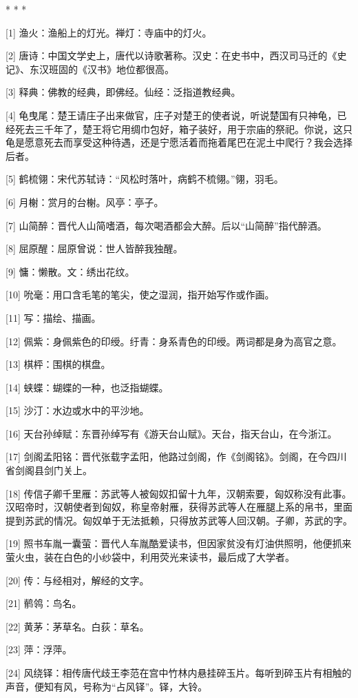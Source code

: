 \documentclass[12pt,UTF8]{ctexbook}
\begin{document}
* * *



[1] 渔火：渔船上的灯光。禅灯：寺庙中的灯火。

[2] 唐诗：中国文学史上，唐代以诗歌著称。汉史：在史书中，西汉司马迁的《史记》、东汉班固的《汉书》地位都很高。

[3] 释典：佛教的经典，即佛经。仙经：泛指道教经典。

[4] 龟曳尾：楚王请庄子出来做官，庄子对楚王的使者说，听说楚国有只神龟，已经死去三千年了，楚王将它用绸巾包好，箱子装好，用于宗庙的祭祀。你说，这只龟是愿意死去而享受这种待遇，还是宁愿活着而拖着尾巴在泥土中爬行？我会选择后者。

[5] 鹤梳翎：宋代苏轼诗：“风松时落叶，病鹤不梳翎。”翎，羽毛。

[6] 月榭：赏月的台榭。风亭：亭子。

[7] 山简醉：晋代人山简嗜酒，每次喝酒都会大醉。后以“山简醉”指代醉酒。

[8] 屈原醒：屈原曾说：世人皆醉我独醒。

[9] 慵：懒散。文：绣出花纹。

[10] 吮毫：用口含毛笔的笔尖，使之湿润，指开始写作或作画。

[11] 写：描绘、描画。

[12] 佩紫：身佩紫色的印绶。纡青：身系青色的印绶。两词都是身为高官之意。

[13] 棋枰：围棋的棋盘。

[14] 蛱蝶：蝴蝶的一种，也泛指蝴蝶。

[15] 沙汀：水边或水中的平沙地。

[16] 天台孙绰赋：东晋孙绰写有《游天台山赋》。天台，指天台山，在今浙江。

[17] 剑阁孟阳铭：晋代张载字孟阳，他路过剑阁，作《剑阁铭》。剑阁，在今四川省剑阁县剑门关上。

[18] 传信子卿千里雁：苏武等人被匈奴扣留十九年，汉朝索要，匈奴称没有此事。汉昭帝时，汉朝使者到匈奴，称皇帝射雁，获得苏武等人在雁腿上系的帛书，里面提到苏武的情况。匈奴单于无法抵赖，只得放苏武等人回汉朝。子卿，苏武的字。

[19] 照书车胤一囊萤：晋代人车胤酷爱读书，但因家贫没有灯油供照明，他便抓来萤火虫，装在白色的小纱袋中，利用荧光来读书，最后成了大学者。

[20] 传：与经相对，解经的文字。

[21] 鹡鸰：鸟名。

[22] 黄茅：茅草名。白荻：草名。

[23] 萍：浮萍。

[24] 风绕铎：相传唐代歧王李范在宫中竹林内悬挂碎玉片。每听到碎玉片有相触的声音，便知有风，号称为“占风铎”。铎，大铃。
\end{document}

